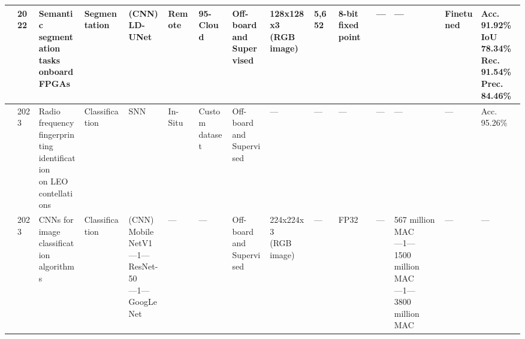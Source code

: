 \begin{center}
{\begin{tabular}{lllllllllllllll}
\cite{papatheofanousSoCFPGAAcceleration2022} & 2022 & \makecell[tl]{Semantic\\ segmentation\\ tasks onboard\\ FPGAs} & Segmentation & \makecell[tl]{(CNN)\\ LD-UNet} & Remote & 95-Cloud & \makecell[tl]{Off-board\\ and\\ Supervised} & \makecell[tl]{128x128x3\\ (RGB image)} & 5,652 & \makecell[tl]{8-bit\\ fixed point} & --- & --- & Finetuned & \makecell[tl]{Acc. 91.92\%\\ IoU 78.34\%\\ Rec. 91.54\%\\ Prec. 84.46\%\\}  \\ \hline
\cite{jiangRFFingerprintingIdentification2023} & 2023 & \makecell[tl]{Radio frequency\\ fingerprinting\\ identification\\ on LEO\\ contellations} & Classification & SNN & In-Situ & \makecell[tl]{Custom\\ dataset} & \makecell[tl]{Off-board\\ and\\ Supervised} & --- & --- & --- & --- & --- & --- & Acc. 95.26\% \\ \hline
\cite{perrymanEvaluationXilinxVersal2023} & 2023 & \makecell[tl]{CNNs for image\\ classification\\ algorithms} & Classification & \makecell[tl]{(CNN)\\ MobileNetV1\\ ---1---\\ ResNet-50\\ ---1---\\ GoogLeNet} & --- & --- & \makecell[tl]{Off-board\\ and\\ Supervised} & \makecell[tl]{224x224x3\\ (RGB image)} & --- & FP32 & --- & \makecell[tl]{567 million MAC\\ ---1---\\ 1500 million MAC\\ ---1---\\ 3800 million MAC} & --- & --- \\ 

\end{tabular}}
\end{center}
